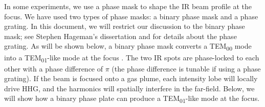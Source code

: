 In some experiments, we use a phase mask to shape the IR beam profile at the focus. We have used two types of phase masks: a binary phase mask and a phase grating. In this document, we will restrict our discussion to the binary phase mask; see Stephen Hageman's dissertation \cite{hagemanComplexAttosecondTransientAbsorption2020} and \cite{camperHighRelativephasePrecision2019} for details about the phase grating. As will be shown below, a binary phase mask converts a TEM\textsubscript{00} mode into a TEM\textsubscript{01}-like mode at the focus \cite{hagemanComplexAttosecondTransientAbsorption2020,camperHighRelativephasePrecision2019,camperTransverseElectromagneticMode2015,camperHighharmonicPhaseSpectroscopy2014,camperCombinedHighharmonicInterferometries2015}. The two IR spots are phase-locked to each other with a phase difference of $\pi$ (the phase difference is tunable if using a phase grating). If the beam is focused onto a gas plume, each intensity lobe will locally drive HHG, and the harmonics will spatially interfere in the far-field. Below, we will show how a binary phase plate can produce a TEM\textsubscript{01}-like mode at the focus.

